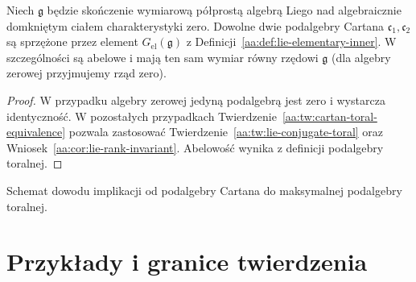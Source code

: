 \begin{wniosek}
\label{aa:cor:cartan-conjugacy-full}
Niech $\mathfrak g$ będzie skończenie wymiarową półprostą algebrą Liego nad algebraicznie domkniętym ciałem charakterystyki zero. Dowolne dwie podalgebry Cartana $\mathfrak c_1,\mathfrak c_2$ są sprzężone przez element $G_{\mathrm{el}}(\mathfrak g)$ z Definicji~\ref{aa:def:lie-elementary-inner}. W szczególności są abelowe i mają ten sam wymiar równy rzędowi $\mathfrak g$ (dla algebry zerowej przyjmujemy rząd zero).
\end{wniosek}
\begin{proof}
W przypadku algebry zerowej jedyną podalgebrą jest zero i wystarcza identyczność. W pozostałych przypadkach Twierdzenie~\ref{aa:tw:cartan-toral-equivalence} pozwala zastosować Twierdzenie~\ref{aa:tw:lie-conjugate-toral} oraz Wniosek~\ref{aa:cor:lie-rank-invariant}. Abelowość wynika z definicji podalgebry toralnej.
\end{proof}

\begin{center}

\small Schemat dowodu implikacji od podalgebry Cartana do maksymalnej podalgebry toralnej.
\end{center}

\section{Przykłady i granice twierdzenia}

